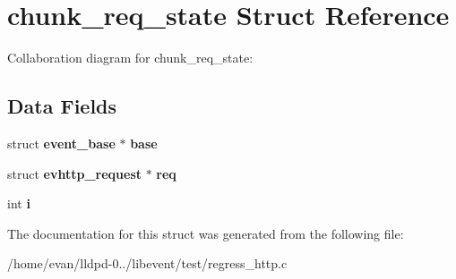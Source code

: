\section{chunk\-\_\-req\-\_\-state \-Struct \-Reference}
\label{structchunk__req__state}


\-Collaboration diagram for chunk\-\_\-req\-\_\-state\-:
\subsection*{\-Data \-Fields}
\begin{DoxyCompactItemize}
\item 
struct {\bf event\-\_\-base} $\ast$ {\bfseries base}\label{structchunk__req__state_ab1a154f7530a81e9dd1d63fc6b98a5c7}

\item 
struct {\bf evhttp\-\_\-request} $\ast$ {\bfseries req}\label{structchunk__req__state_a27a6cc58bd947852de09feaa5a40f768}

\item 
int {\bfseries i}\label{structchunk__req__state_acb559820d9ca11295b4500f179ef6392}

\end{DoxyCompactItemize}


\-The documentation for this struct was generated from the following file\-:\begin{DoxyCompactItemize}
\item 
/home/evan/lldpd-\/0../libevent/test/regress\-\_\-http.\-c\end{DoxyCompactItemize}
